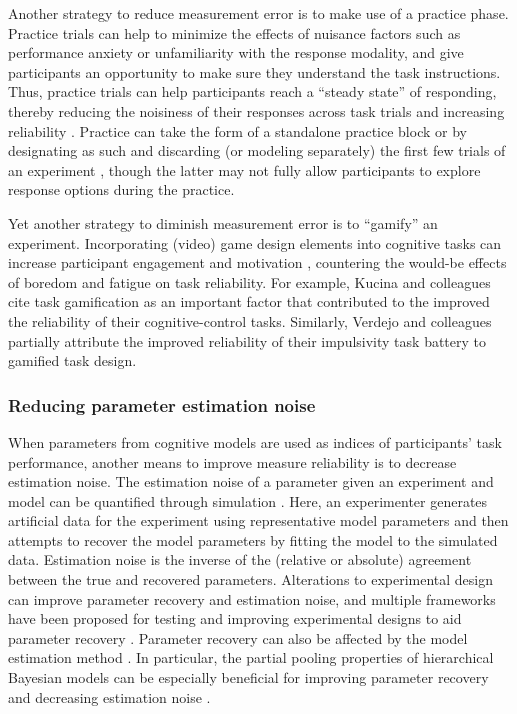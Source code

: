 \documentclass[a4paper,notitlepage,12pt]{article}
\begin{document}
Another strategy to reduce measurement error is to make use of a practice phase. Practice trials can help to minimize the effects of nuisance factors such as performance anxiety or unfamiliarity with the response modality, and give participants an opportunity to make sure they understand the task instructions. Thus, practice trials can help participants reach a ``steady state'' of responding, thereby reducing the noisiness of their responses across task trials and increasing reliability \cite{alexander2003effects}. Practice can take the form of a standalone practice block or by designating as such and discarding (or modeling separately) the first few trials of an experiment \cite{mclean2018towards}, though the latter may not fully allow participants to explore response options during the practice. 

Yet another strategy to diminish measurement error is to ``gamify'' an experiment. Incorporating (video) game design elements into cognitive tasks can increase participant engagement and motivation \cite{sailer2017gamification}, countering the would-be effects of boredom and fatigue on task reliability. For example, Kucina and colleagues \cite{kucina2022solution} cite task gamification as an important factor that contributed to the improved the reliability of their cognitive-control tasks. Similarly, Verdejo and colleagues \cite{verdejo2021unified} partially attribute the improved reliability of their impulsivity task battery to gamified task design. 

\subsubsection{Reducing parameter estimation noise}

When parameters from cognitive models are used as indices of participants' task performance, another means to improve measure reliability is to decrease estimation noise. The estimation noise of a parameter given an experiment and model can be quantified through simulation \cite{wilson2019ten, palminteri2017importance}. Here, an experimenter generates artificial data for the experiment using representative model parameters and then attempts to recover the model parameters by fitting the model to the simulated data. Estimation noise is the inverse of the (relative or absolute) agreement between the true and recovered parameters. Alterations to experimental design can improve parameter recovery and estimation noise, and multiple frameworks have been proposed for testing and improving experimental designs to aid parameter recovery \cite{broomell2014parameter, melinscak2020computational}. Parameter recovery can also be affected by the model estimation method \cite{Lerche2017-yg, waltmann2022sufficient}. In particular, the partial pooling properties of hierarchical Bayesian models can be especially beneficial for improving parameter recovery and decreasing estimation noise \cite{katahira2016hierarchical}.
\end{document}

